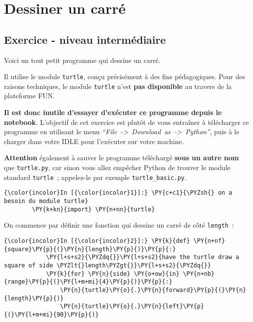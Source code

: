     
    
    
    

    

    \hypertarget{dessiner-un-carruxe9}{%
\section{Dessiner un carré}\label{dessiner-un-carruxe9}}

    \hypertarget{exercice---niveau-intermuxe9diaire}{%
\subsection{Exercice - niveau
intermédiaire}\label{exercice---niveau-intermuxe9diaire}}

    Voici un tout petit programme qui dessine un carré.

    Il utilise le module \texttt{turtle}, conçu précisément à des fins
pédagogiques. Pour des raisons techniques, le module \texttt{turtle}
n'est \textbf{pas disponible} au travers de la plateforme FUN.

    \textbf{Il est donc inutile d'essayer d'exécuter ce programme depuis le
notebook}. L'objectif de cet exercice est plutôt de vous entraîner à
télécharger ce programme en utilisant le menu
\emph{``File~-\textgreater{}~Download~as~-\textgreater{}~Python''}, puis
à le charger dans votre IDLE pour l'exécuter sur votre machine.

    \textbf{Attention} également à sauver le programme téléchargé
\textbf{sous un autre nom} que \texttt{turtle.py}, car sinon vous allez
empêcher Python de trouver le module standard \texttt{turtle}~;
appelez-le par exemple \texttt{turtle\_basic.py}.

    \begin{Verbatim}[commandchars=\\\{\}]
{\color{incolor}In [{\color{incolor}1}]:} \PY{c+c1}{\PYZsh{} on a besoin du module turtle}
        \PY{k+kn}{import} \PY{n+nn}{turtle}
\end{Verbatim}


    On commence par définir une fonction qui dessine un carré de côté
\texttt{length}~:

    \begin{Verbatim}[commandchars=\\\{\}]
{\color{incolor}In [{\color{incolor}2}]:} \PY{k}{def} \PY{n+nf}{square}\PY{p}{(}\PY{n}{length}\PY{p}{)}\PY{p}{:}
            \PY{l+s+s2}{\PYZdq{}}\PY{l+s+s2}{have the turtle draw a square of side \PYZlt{}length\PYZgt{}}\PY{l+s+s2}{\PYZdq{}}
            \PY{k}{for} \PY{n}{side} \PY{o+ow}{in} \PY{n+nb}{range}\PY{p}{(}\PY{l+m+mi}{4}\PY{p}{)}\PY{p}{:}
                \PY{n}{turtle}\PY{o}{.}\PY{n}{forward}\PY{p}{(}\PY{n}{length}\PY{p}{)}
                \PY{n}{turtle}\PY{o}{.}\PY{n}{left}\PY{p}{(}\PY{l+m+mi}{90}\PY{p}{)}
\end{Verbatim}


